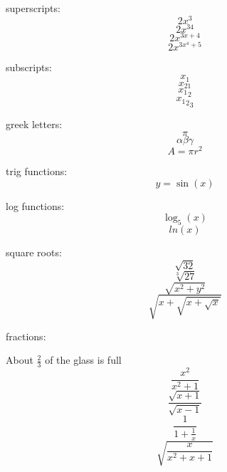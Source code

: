 \documentclass[11pt]{article}
\begin{document}
superscripts: 
$$2x^3$$
$$2x^{34}$$
$$2x^{3x+4}$$
$$2x^{3x^4+5}$$

subscripts:
$$x_1$$
$$x_{21}$$
$${x_1}_2$$
$${{x_1}_2}_3$$

greek letters:
$$\pi$$
$$\alpha \beta \gamma$$
$$A=\pi r^2$$

trig functions:
$$y=\sin(x)$$

log functions:
$$\log_5(x)$$
$$ln(x)$$

square roots:
$$\sqrt{32}$$
$$\sqrt[3]{27}$$
$$\sqrt{x^2+y^2}$$
$$\sqrt{x+\sqrt{x+\sqrt{x}}}$$

fractions:

About $\displaystyle{\frac{2}{3}}$ of the glass is full
$$\frac{x^2}{x^2+1}$$
$$\frac{\sqrt{x+1}}{\sqrt{x-1}}$$
$$\frac{1}{1+\frac{1}{x}}$$
$$\sqrt{\frac{x}{x^2+x+1}}$$
\end{document}
